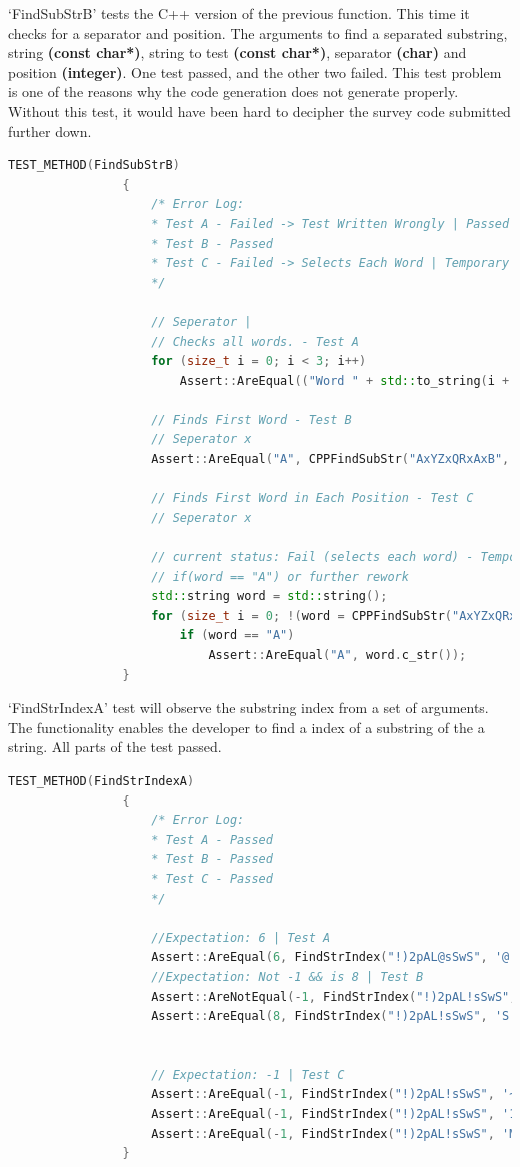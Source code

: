 \documentclass[12pt]{report} %
\begin{document}
			`FindSubStrB' tests the C++ version of the previous function. This time it checks for a separator and position. The arguments to find a separated substring, string \textbf{(const char*)}, string to test \textbf{(const char*)}, separator \textbf{(char)} and position \textbf{(integer)}. One test passed, and the other two failed. This test problem is one of the reasons why the code generation does not generate properly. Without this test, it would have been hard to decipher the survey code submitted further down.

			\begin{lstlisting}[language=c++]
				TEST_METHOD(FindSubStrB)
				{
					/* Error Log:
					* Test A - Failed -> Test Written Wrongly | Passed
					* Test B - Passed
					* Test C - Failed -> Selects Each Word | Temporary Solution: Read Below.
					*/

					// Seperator |
					// Checks all words. - Test A
					for (size_t i = 0; i < 3; i++)
						Assert::AreEqual(("Word " + std::to_string(i + 1)).c_str(), CPPFindSubStr("Word 1|Word 2|Word 3", "Word", '|', i).c_str());

					// Finds First Word - Test B
					// Seperator x
					Assert::AreEqual("A", CPPFindSubStr("AxYZxQRxAxB", "A", 'x', 0).c_str());

					// Finds First Word in Each Position - Test C
					// Seperator x

					// current status: Fail (selects each word) - Temporary solution:
					// if(word == "A") or further rework
					std::string word = std::string();
					for (size_t i = 0; !(word = CPPFindSubStr("AxYZxQRxAxB", "A", 'x', (int)i)).empty(); i++)
						if (word == "A")
							Assert::AreEqual("A", word.c_str());
				}
			\end{lstlisting}

			`FindStrIndexA' test will observe the substring index from a set of arguments. The functionality enables the developer to find a index of a substring of the a string. All parts of the test passed.
			\begin{lstlisting}[language=c++]
				TEST_METHOD(FindStrIndexA)
				{
					/* Error Log:
					* Test A - Passed
					* Test B - Passed
					* Test C - Passed
					*/

					//Expectation: 6 | Test A
					Assert::AreEqual(6, FindStrIndex("!)2pAL@sSwS", '@'));
					//Expectation: Not -1 && is 8 | Test B
					Assert::AreNotEqual(-1, FindStrIndex("!)2pAL!sSwS", 'S'));
					Assert::AreEqual(8, FindStrIndex("!)2pAL!sSwS", 'S'));


					// Expectation: -1 | Test C
					Assert::AreEqual(-1, FindStrIndex("!)2pAL!sSwS", '~'));
					Assert::AreEqual(-1, FindStrIndex("!)2pAL!sSwS", '1'));
					Assert::AreEqual(-1, FindStrIndex("!)2pAL!sSwS", 'M'));
				}
			\end{lstlisting}
\end{document}
